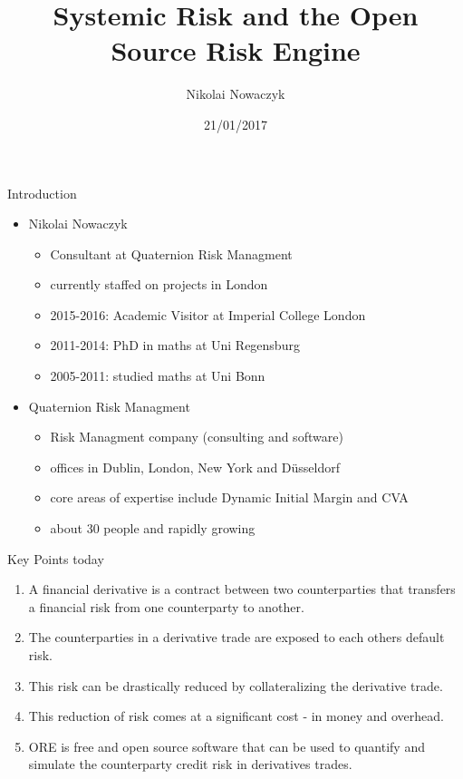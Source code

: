 \documentclass[t]{beamer}
\title[ORE]{Systemic Risk and the Open Source Risk Engine}
\author{Nikolai Nowaczyk}
\date{21/01/2017}
\begin{document}


\begin{frame}
	\maketitle
\end{frame}

\begin{frame}{Introduction}
	\begin{itemize}
		\item
		Nikolai Nowaczyk
		\begin{itemize}
			\item
				Consultant at Quaternion Risk Managment
			\item 
				currently staffed on projects in London
			\item
				2015-2016: Academic Visitor at Imperial College London			
			\item
				2011-2014: PhD in maths at Uni Regensburg			
			\item
				2005-2011: studied maths at Uni Bonn 
		\end{itemize}
		\item
			Quaternion Risk Managment
			\begin{itemize}
				\item
					Risk Managment company (consulting and software)
				\item
					offices in Dublin, London, New York and Düsseldorf
				\item
					core areas of expertise include Dynamic Initial Margin and CVA
				\item
					about 30 people and rapidly growing
			\end{itemize}
	\end{itemize}
\end{frame}
	
\begin{frame}{Key Points today}
	\begin{enumerate}
		\item
		A financial derivative is a contract between two counterparties that transfers a financial risk from one counterparty to another.
		\item
		The counterparties in a derivative trade are exposed to each others default risk.
		\item
		This risk can be drastically reduced by collateralizing the derivative trade.
		\item
		This reduction of risk comes at a significant cost - in money and overhead.	
		\item
		ORE is free and open source software that can be used to quantify and simulate the counterparty credit risk in derivatives trades.					
	\end{enumerate}
	
\end{frame}
\end{document}
